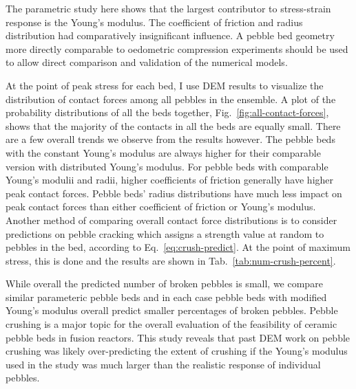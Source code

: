 The parametric study here shows that the largest contributor to stress-strain response is the Young’s modulus. The coefficient of friction and radius distribution had comparatively insignificant influence. A pebble bed geometry more directly comparable to oedometric compression experiments should be used to allow direct comparison and validation of the numerical models.


At the point of peak stress for each bed, I use DEM results to visualize the distribution of contact forces among all pebbles in the ensemble. A plot of the probability distributions of all the beds together, Fig.~\ref{fig:all-contact-forces}, shows that the majority of the contacts in all the beds are equally small. There are a few overall trends we observe from the results however. The pebble beds with the constant Young's modulus are always higher for their comparable version with distributed Young's modulus. For pebble beds with comparable Young's modulii and radii, higher coefficients of friction generally have higher peak contact forces. Pebble beds' radius distributions have much less impact on peak contact forces than either coefficient of friction or Young’s modulus. Another method of comparing overall contact force distributions is to consider predictions on pebble cracking which assigns a strength value at random to pebbles in the bed, according to Eq.~\ref{eq:crush-predict}. At the point of maximum stress, this is done and the results are shown in Tab.~\ref{tab:num-crush-percent}.

While overall the predicted number of broken pebbles is small, we compare similar parameteric pebble beds and in each case pebble beds with modified Young’s modulus overall predict smaller percentages of broken pebbles. Pebble crushing is a major topic for the overall evaluation of the feasibility of ceramic pebble beds in fusion reactors. This study reveals that past DEM work on pebble crushing was likely over-predicting the extent of crushing if the Young's modulus used in the study was much larger than the realistic response of individual pebbles.

